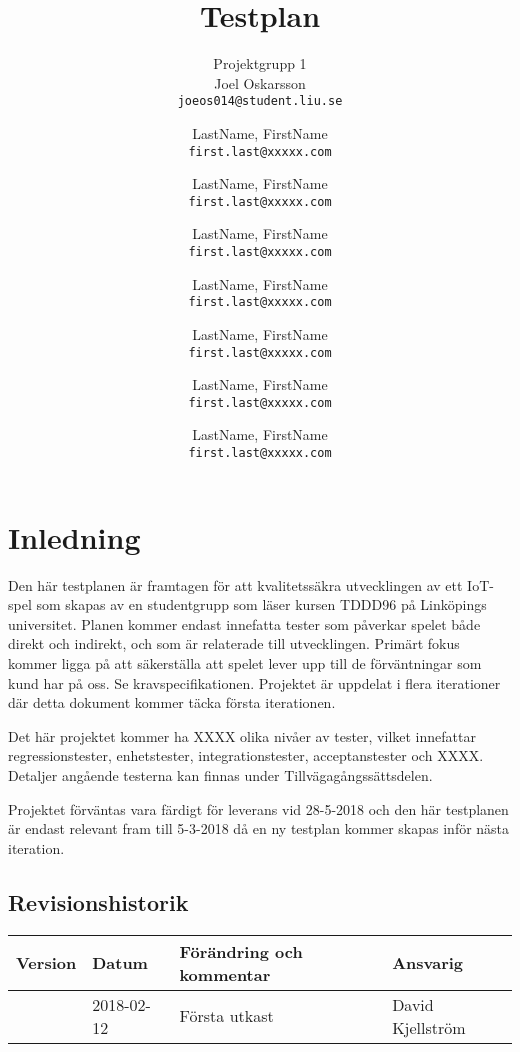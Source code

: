 \documentclass[10pt]{article}
\title{Testplan}
\author{
	Projektgrupp 1\\
	Joel Oskarsson\\
	\texttt{joeos014@student.liu.se}
	\and
	LastName, FirstName\\
	\texttt{first.last@xxxxx.com}
	\and
	LastName, FirstName\\
	\texttt{first.last@xxxxx.com}
	\and
	LastName, FirstName\\
	\texttt{first.last@xxxxx.com}
	\and
	LastName, FirstName\\
	\texttt{first.last@xxxxx.com}
  	\and
  	LastName, FirstName\\
  	\texttt{first.last@xxxxx.com}
  	\and
  	LastName, FirstName\\
  	\texttt{first.last@xxxxx.com}
  	\and
  	LastName, FirstName\\
  	\texttt{first.last@xxxxx.com}
}
\begin{document}
\maketitle
\pagebreak
\tableofcontents
\pagebreak
\section{Inledning}
	Den här testplanen är framtagen för att kvalitetssäkra utvecklingen av ett IoT-spel som skapas av en studentgrupp som läser kursen TDDD96 på Linköpings universitet. Planen kommer endast innefatta tester som påverkar spelet både direkt och indirekt, och som är relaterade till utvecklingen. Primärt fokus kommer ligga på att säkerställa att spelet lever upp till de förväntningar som kund har på oss. Se kravspecifikationen. Projektet är uppdelat i flera iterationer där detta dokument kommer täcka första iterationen.

Det här projektet kommer ha {\color{red}XXXX} olika nivåer av tester, vilket innefattar regressionstester, enhetstester, integrationstester, acceptanstester och {\color{red}XXXX}. Detaljer angående testerna kan finnas under Tillvägagångssättsdelen.

Projektet förväntas vara färdigt för leverans vid {\color{red}28-5-2018} och den här testplanen är endast relevant fram till {\color{red}5-3-2018} då en ny testplan kommer skapas inför nästa iteration.

	\subsection{Revisionshistorik}

	
	\begin{center}
 	   \begin{tabular}{| l | l | l |  l | }
 	       \hline
 	       \textbf{Version} & \textbf{Datum} & \textbf{Förändring och kommentar} & \textbf{Ansvarig} \\
 	       \hline
 	       \centering 0.1 & 2018-02-12 & Första utkast & David Kjellström\\
 	       \hline
 	   \end{tabular}
	\end{center}
\end{document}
